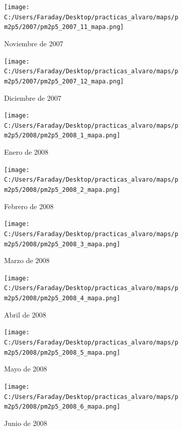 \documentclass[12pt]{article}
\begin{document}
\begin{figure}[H]
\centering
\begin{subfigure}[h]{0.45\textwidth}
\texttt{[image: C:/Users/Faraday/Desktop/practicas\_alvaro/maps/pm2p5/2007/pm2p5\_2007\_11\_mapa.png]}
\caption{Noviembre de 2007}
\label{fig:map-mon-4-11-2007}
\end{subfigure}
%
\begin{subfigure}[H]{0.45\textwidth}
\texttt{[image: C:/Users/Faraday/Desktop/practicas\_alvaro/maps/pm2p5/2007/pm2p5\_2007\_12\_mapa.png]}
\caption{Diciembre de 2007}
\label{fig:map-mon-4-12-2007}
\end{subfigure}
\caption{}
\end{figure}

\newpage

\begin{figure}[H]
\centering
\begin{subfigure}[h]{0.45\textwidth}
\texttt{[image: C:/Users/Faraday/Desktop/practicas\_alvaro/maps/pm2p5/2008/pm2p5\_2008\_1\_mapa.png]}
\caption{Enero de 2008}
\label{fig:map-mon-4-1-2008}
\end{subfigure}
%
\begin{subfigure}[H]{0.45\textwidth}
\texttt{[image: C:/Users/Faraday/Desktop/practicas\_alvaro/maps/pm2p5/2008/pm2p5\_2008\_2\_mapa.png]}
\caption{Febrero de 2008}
\label{fig:map-mon-4-2-2008}
\end{subfigure}
\caption{}
\end{figure}

\begin{figure}[H]
\centering
\begin{subfigure}[h]{0.45\textwidth}
\texttt{[image: C:/Users/Faraday/Desktop/practicas\_alvaro/maps/pm2p5/2008/pm2p5\_2008\_3\_mapa.png]}
\caption{Marzo de 2008}
\label{fig:map-mon-4-3-2008}
\end{subfigure}
%
\begin{subfigure}[H]{0.45\textwidth}
\texttt{[image: C:/Users/Faraday/Desktop/practicas\_alvaro/maps/pm2p5/2008/pm2p5\_2008\_4\_mapa.png]}
\caption{Abril de 2008}
\label{fig:map-mon-4-4-2008}
\end{subfigure}
\caption{}
\end{figure}

\begin{figure}[H]
\centering
\begin{subfigure}[h]{0.45\textwidth}
\texttt{[image: C:/Users/Faraday/Desktop/practicas\_alvaro/maps/pm2p5/2008/pm2p5\_2008\_5\_mapa.png]}
\caption{Mayo de 2008}
\label{fig:map-mon-4-5-2008}
\end{subfigure}
%
\begin{subfigure}[H]{0.45\textwidth}
\texttt{[image: C:/Users/Faraday/Desktop/practicas\_alvaro/maps/pm2p5/2008/pm2p5\_2008\_6\_mapa.png]}
\caption{Junio de 2008}
\label{fig:map-mon-4-6-2008}
\end{subfigure}
\caption{}
\end{figure}
\end{document}
